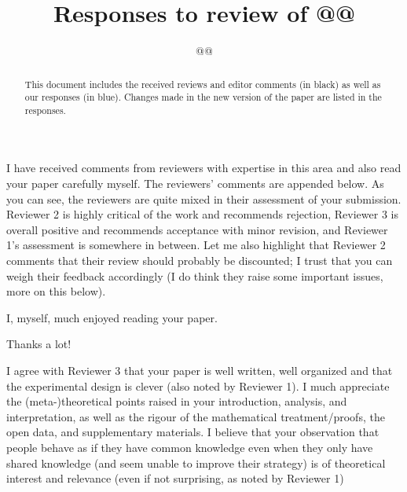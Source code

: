 \documentclass[a4paper]{article}
\title{Responses to review of @@}
\author{@@}
\newenvironment{response}{\smallskip \noindent \color{blue}}{\color{black}\smallskip}
\begin{document}
\maketitle
\begin{abstract}
\begin{response}This document includes the received reviews and editor comments  (in black) as well as our responses (in blue). Changes made in the new version of the paper are listed in the responses.\end{response} 
\end{abstract}


I have received comments from reviewers with expertise in this area and also read your paper carefully myself. The reviewers’ comments are appended below. As you can see, the reviewers are quite mixed in their assessment of your submission. Reviewer 2 is highly critical of the work and recommends rejection, Reviewer 3 is overall positive and recommends acceptance with minor revision, and Reviewer 1’s assessment is somewhere in between. Let me also highlight that Reviewer 2 comments that their review should probably be discounted; I trust that you can weigh their feedback accordingly (I do think they raise some important issues, more on this below).


I, myself, much enjoyed reading your paper.

\begin{response}
Thanks a lot!
\end{response}

I agree with Reviewer 3 that your paper is well written, well organized and that the experimental design is clever (also noted by Reviewer 1). I much appreciate the (meta-)theoretical points raised in your introduction, analysis, and interpretation, as well as the rigour of the mathematical treatment/proofs, the open data, and supplementary materials. I believe that your observation that people behave as if they have common knowledge even when they only have shared knowledge (and seem unable to improve their strategy) is of theoretical interest and relevance (even if not surprising, as noted by Reviewer 1)
\end{document}
